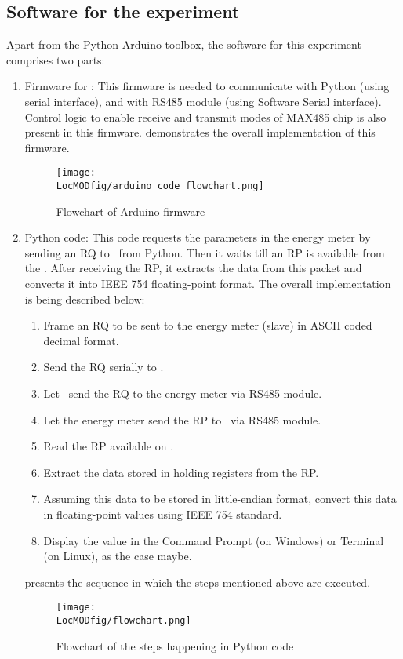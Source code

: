 \subsection{Software for the experiment}
Apart from the Python-Arduino toolbox, the software for this experiment comprises two parts:
\begin{enumerate}
\item  Firmware for \arduino: This firmware is needed to communicate
with Python (using serial interface), and with RS485 module (using
Software Serial interface). Control logic to enable receive and
transmit modes of MAX485 chip is also present in this firmware.  demonstrates the overall implementation of this firmware.

\begin{figure}
  \centering
  \texttt{[image: \\LocMODfig/arduino\_code\_flowchart.png]}
  \caption{Flowchart of Arduino firmware}
  \label{fig:modbus-firmware}
\end{figure}

\item Python code: This code requests the parameters in the energy meter
by sending an RQ to \arduino\ from Python. Then it waits till
an RP is available from the \arduino. After receiving the RP, it extracts 
the data from this packet and converts it into IEEE
754 floating-point format. The overall implementation is being
described below:
\begin {enumerate}
\item Frame an RQ to be sent to the energy meter (slave) in ASCII coded decimal
format. 
\item Send the RQ serially to \arduino. 
\item Let \arduino\ send the RQ to the energy meter via RS485 module. 
\item Let the energy meter send the RP to \arduino\ via RS485 module. 
\item Read the RP available on \arduino. 
\item Extract the data stored in holding registers from the RP. 
\item Assuming this data to be stored in little-endian format, 
convert this data in floating-point values using IEEE 754 standard. 
\item Display the value in the Command Prompt (on Windows) or Terminal (on Linux), as the case maybe. 
\end{enumerate}
 presents the sequence in which the steps mentioned above are executed. 
\begin{figure}
  \centering
  \texttt{[image: \\LocMODfig/flowchart.png]}
  \caption{Flowchart of the steps happening in Python code}
  \label{fig:flow-chart}
\end{figure}
\end{enumerate}


